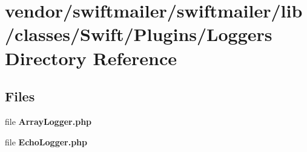 \section{vendor/swiftmailer/swiftmailer/lib/classes/\+Swift/\+Plugins/\+Loggers Directory Reference}
\label{dir_aee4b4675ec59591f06b4208313cda65}
\subsection*{Files}
\begin{DoxyCompactItemize}
\item 
file {\bf Array\+Logger.\+php}
\item 
file {\bf Echo\+Logger.\+php}
\end{DoxyCompactItemize}

